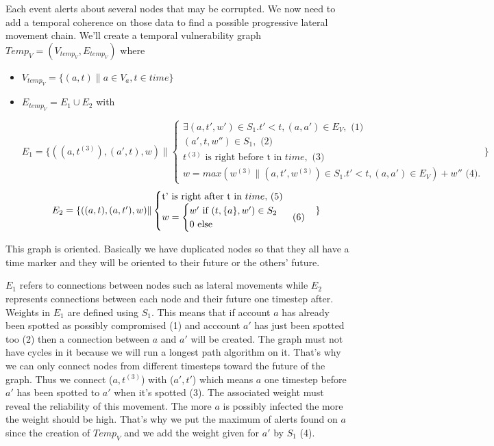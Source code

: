 \documentclass[11pt]{article}
\begin{document}
Each event alerts about several nodes that may be corrupted. We now need to add a temporal coherence on those data to find a possible progressive lateral movement chain. We'll create a temporal vulnerability graph $Temp_V=(V_{temp_V},E_{temp_V})$ where 
\begin{itemize}
\item $V_{temp_V} = \{(a,t) \|a \in V_a, t\in time\}$
\item $E_{temp_V} = E_1 \cup E_2$ with

\begin{equation*}
E_1 = \{((a,t^{(3)}),(a',t),w) \|
\begin{cases}
\exists (a,t',w')\in S_1.t'<t,(a,a')\in E_V,\mbox{ (1)}\\
(a',t,w'')\in S_1,\mbox{ (2)}\\
\mbox{$t^{(3)}$ is right before t in $time$},\mbox{ (3)}\\
w=max(w^{(3)}\|(a,t',w^{(3)})\in S_1.t'<t,(a,a')\in E_V)+w''\mbox{ (4)}.
\end{cases}\}
\end{equation*}
\begin{equation*}
\begin{split}
\mbox{$E_2 = \{((a,t),(a,t'),w) \|$}
\begin{cases}
\mbox{t' is right after t in $time$,\mbox{ (5)}}\\
w = \begin{cases}
\mbox{$w'$ if $(t,\{a\},w')\in S_2$}\\
\mbox{0 else}
\end{cases}\mbox{ (6)}
\end{cases}\}
\end{split}
\end{equation*}
\end{itemize}

This graph is oriented. Basically we have duplicated nodes so that they all have a time marker and they will be oriented to their future or the others' future. 

$E_1$ refers to connections between nodes such as lateral movements while $E_2$ represents connections between each node and their future one timestep after. Weights in $E_1$ are defined using $S_1$. This means that if account $a$ has already been spotted as possibly compromised (1) and acccount $a'$ has just been spotted too (2) then a connection between $a$ and $a'$ will be created. The graph must not have cycles in it because we will run a longest path algorithm on it. That's why we can only connect nodes from different timesteps toward the future of the graph. Thus we connect ($a,t^{(3)}$) with ($a',t'$) which means $a$ one timestep before $a'$ has been spotted to $a'$ when it's spotted (3). The associated weight must reveal the reliability of this movement. The more $a$ is possibly infected the more the weight should be high. That's why we put the maximum of alerts found on $a$ since the creation of $Temp_V$ and we add the weight given for $a'$ by $S_1$ (4).
\end{document}
